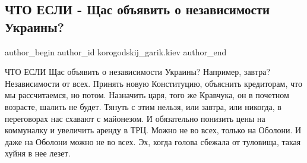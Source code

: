  
 
 
 
 
 
\subsection{ЧТО ЕСЛИ - Щас объявить о независимости Украины?}
\label{sec:24_11_2021.fb.korogodskij_garik.kiev.1.nezavisimost_chto_esli}
 
\ifcmt
 author_begin
   author_id korogodskij_garik.kiev
 author_end
\fi

\obeycr
ЧТО ЕСЛИ 
Щас объявить о независимости Украины?
Например, завтра? 
Независимости от всех. 
Принять новую Конституцию, объяснить кредиторам, что мы рассчитаемся, но потом.
Назначить царя, того же Кравчука, он в почетном возрасте, шалить не будет. 
Тянуть с этим нельзя, или завтра, или никогда, в переговорах нас схавают с майонезом. 
И обязательно понизить цены на коммуналку и увеличить аренду в ТРЦ. Можно не во всех, только на Оболони.
И даже на Оболони можно не во всех. 
Эх, когда голова сбежала от туловища, такая хуйня в нее лезет.
\restorecr

